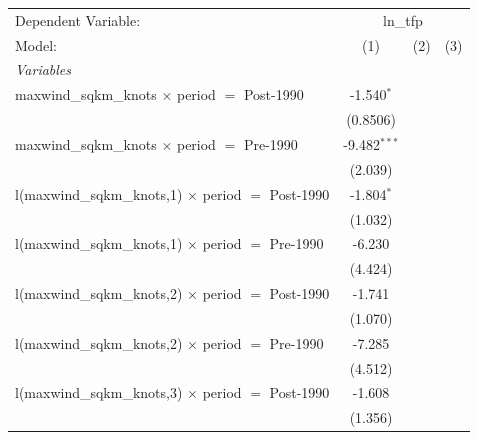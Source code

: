\begingroup
\centering
\begin{tabular}{lccc}
   \tabularnewline \midrule \midrule
   Dependent Variable: & \multicolumn{3}{c}{ln\_tfp}\\
   Model:                                                     & (1)            & (2)                     & (3)\\  
   \midrule
   \emph{Variables}\\
   maxwind\_sqkm\_knots $\times$ period $=$ Post-1990         & -1.540$^{*}$   &                         &   \\   
                                                              & (0.8506)       &                         &   \\   
   maxwind\_sqkm\_knots $\times$ period $=$ Pre-1990          & -9.482$^{***}$ &                         &   \\   
                                                              & (2.039)        &                         &   \\   
   l(maxwind\_sqkm\_knots,1) $\times$ period $=$ Post-1990    & -1.804$^{*}$   &                         &   \\   
                                                              & (1.032)        &                         &   \\   
   l(maxwind\_sqkm\_knots,1) $\times$ period $=$ Pre-1990     & -6.230         &                         &   \\   
                                                              & (4.424)        &                         &   \\   
   l(maxwind\_sqkm\_knots,2) $\times$ period $=$ Post-1990    & -1.741         &                         &   \\   
                                                              & (1.070)        &                         &   \\   
   l(maxwind\_sqkm\_knots,2) $\times$ period $=$ Pre-1990     & -7.285         &                         &   \\   
                                                              & (4.512)        &                         &   \\   
   l(maxwind\_sqkm\_knots,3) $\times$ period $=$ Post-1990    & -1.608         &                         &   \\   
                                                              & (1.356)        &                         &   \\   

\end{tabular}
